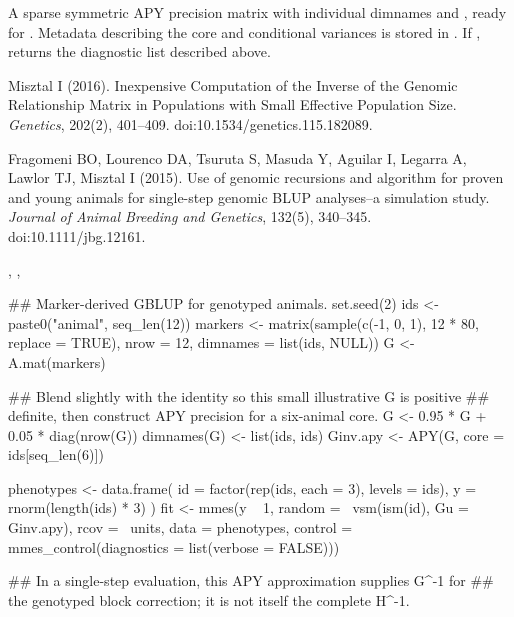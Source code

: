 \documentclass[a4paper]{book}
\begin{document}
%
\begin{Value}
A sparse symmetric APY precision matrix with individual dimnames and
, ready for . Metadata describing
the core and conditional variances is stored in . If
, returns the diagnostic list described above.
\end{Value}
%
\begin{References}\relax
Misztal I (2016). Inexpensive Computation of the Inverse of the Genomic
Relationship Matrix in Populations with Small Effective Population Size.
\emph{Genetics}, 202(2), 401--409. doi:10.1534/genetics.115.182089.

Fragomeni BO, Lourenco DA, Tsuruta S, Masuda Y, Aguilar I, Legarra A, Lawlor
TJ, Misztal I (2015). Use of genomic recursions and algorithm for proven and
young animals for single-step genomic BLUP analyses--a simulation study.
\emph{Journal of Animal Breeding and Genetics}, 132(5), 340--345.
doi:10.1111/jbg.12161.
\end{References}
%
\begin{SeeAlso}\relax
{}, , 
\end{SeeAlso}
%
\begin{Examples}
\begin{ExampleCode}
## Marker-derived GBLUP for genotyped animals.
set.seed(2)
ids <- paste0("animal", seq_len(12))
markers <- matrix(sample(c(-1, 0, 1), 12 * 80, replace = TRUE), nrow = 12,
                  dimnames = list(ids, NULL))
G <- A.mat(markers)

## Blend slightly with the identity so this small illustrative G is positive
## definite, then construct APY precision for a six-animal core.
G <- 0.95 * G + 0.05 * diag(nrow(G))
dimnames(G) <- list(ids, ids)
Ginv.apy <- APY(G, core = ids[seq_len(6)])

phenotypes <- data.frame(
  id = factor(rep(ids, each = 3), levels = ids),
  y = rnorm(length(ids) * 3)
)
fit <- mmes(y ~ 1,
  random = ~vsm(ism(id), Gu = Ginv.apy),
  rcov = ~units,
  data = phenotypes,
  control = mmes_control(diagnostics = list(verbose = FALSE)))

## In a single-step evaluation, this APY approximation supplies G^{-1} for
## the genotyped block correction; it is not itself the complete H^{-1}.
\end{ExampleCode}
\end{Examples}
\end{document}
